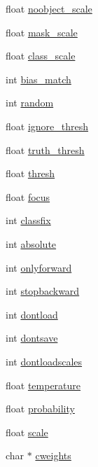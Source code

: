 \begin{DoxyCompactItemize}
\item 
float \mbox{\hyperlink{structlayer_ad10b4f2f32b1991c3cd8e66d138c5eaa}{noobject\+\_\+scale}}
\item 
float \mbox{\hyperlink{structlayer_a9e6e9d0cbdfbef34920e842d0542670e}{mask\+\_\+scale}}
\item 
float \mbox{\hyperlink{structlayer_a7175af778d4be5a066ccc212421617b7}{class\+\_\+scale}}
\item 
int \mbox{\hyperlink{structlayer_a9f5919edff3bdaa0e3f02f13728415c3}{bias\+\_\+match}}
\item 
int \mbox{\hyperlink{structlayer_a411feca89284377c83dd97141540dd83}{random}}
\item 
float \mbox{\hyperlink{structlayer_ad1052957257631f1cba42a25ed63159b}{ignore\+\_\+thresh}}
\item 
float \mbox{\hyperlink{structlayer_a53f9de692e18bf39eeaf322afa9612cb}{truth\+\_\+thresh}}
\item 
float \mbox{\hyperlink{structlayer_a20c059ef419e2b863c67d4df87ec4488}{thresh}}
\item 
float \mbox{\hyperlink{structlayer_afa6d90f3ca746a776b5d79b3f8ead52d}{focus}}
\item 
int \mbox{\hyperlink{structlayer_a510630027ff3061ae0ad07e151fbf1a5}{classfix}}
\item 
int \mbox{\hyperlink{structlayer_afe0cd75c5d7d210ec413df79b73aa40a}{absolute}}
\item 
int \mbox{\hyperlink{structlayer_a975a97f550b56c3503feba36b8eacf45}{onlyforward}}
\item 
int \mbox{\hyperlink{structlayer_ada9c281fad0eae687276387e0dc5d8d1}{stopbackward}}
\item 
int \mbox{\hyperlink{structlayer_a90d11f2ddc0ae1f0bfcce33d5eab9f1b}{dontload}}
\item 
int \mbox{\hyperlink{structlayer_acc28d07d2164bd944a3a3857b482629d}{dontsave}}
\item 
int \mbox{\hyperlink{structlayer_a5ba6e7bfc48b309721ddbed942d2d531}{dontloadscales}}
\item 
float \mbox{\hyperlink{structlayer_a965290dca263c7774c9e9b4272a43c49}{temperature}}
\item 
float \mbox{\hyperlink{structlayer_a3c133867d28268532e3786ae75db47fc}{probability}}
\item 
float \mbox{\hyperlink{structlayer_a7225a2fa7d8cf13688e1c8a421f3ad7f}{scale}}
\item 
char $\ast$ \mbox{\hyperlink{structlayer_a5a1da440e0ebe63674288f9006bd8ad7}{cweights}}

\end{DoxyCompactItemize}
